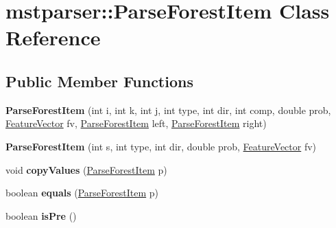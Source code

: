 \hypertarget{classmstparser_1_1ParseForestItem}{
\section{mstparser::ParseForestItem Class Reference}
\label{classmstparser_1_1ParseForestItem}
}
\subsection*{Public Member Functions}
\begin{DoxyCompactItemize}
\item 
\hypertarget{classmstparser_1_1ParseForestItem_ad6f6c3bf6edbf2ee2efd453f735138d1}{
{\bfseries ParseForestItem} (int i, int k, int j, int type, int dir, int comp, double prob, \hyperlink{classmstparser_1_1FeatureVector}{FeatureVector} fv, \hyperlink{classmstparser_1_1ParseForestItem}{ParseForestItem} left, \hyperlink{classmstparser_1_1ParseForestItem}{ParseForestItem} right)}
\label{classmstparser_1_1ParseForestItem_ad6f6c3bf6edbf2ee2efd453f735138d1}

\item 
\hypertarget{classmstparser_1_1ParseForestItem_a41a1c2476a3fdc2a955cacf79fbcaf95}{
{\bfseries ParseForestItem} (int s, int type, int dir, double prob, \hyperlink{classmstparser_1_1FeatureVector}{FeatureVector} fv)}
\label{classmstparser_1_1ParseForestItem_a41a1c2476a3fdc2a955cacf79fbcaf95}

\item 
\hypertarget{classmstparser_1_1ParseForestItem_a83198a8840e631aac48a9b6f7a40c29c}{
void {\bfseries copyValues} (\hyperlink{classmstparser_1_1ParseForestItem}{ParseForestItem} p)}
\label{classmstparser_1_1ParseForestItem_a83198a8840e631aac48a9b6f7a40c29c}

\item 
\hypertarget{classmstparser_1_1ParseForestItem_ab3d01175df7f5a79e34ff61eb3281158}{
boolean {\bfseries equals} (\hyperlink{classmstparser_1_1ParseForestItem}{ParseForestItem} p)}
\label{classmstparser_1_1ParseForestItem_ab3d01175df7f5a79e34ff61eb3281158}

\item 
\hypertarget{classmstparser_1_1ParseForestItem_ae1a3a8913f60581a1e0efa5cff87c0c3}{
boolean {\bfseries isPre} ()}
\label{classmstparser_1_1ParseForestItem_ae1a3a8913f60581a1e0efa5cff87c0c3}

\end{DoxyCompactItemize}
